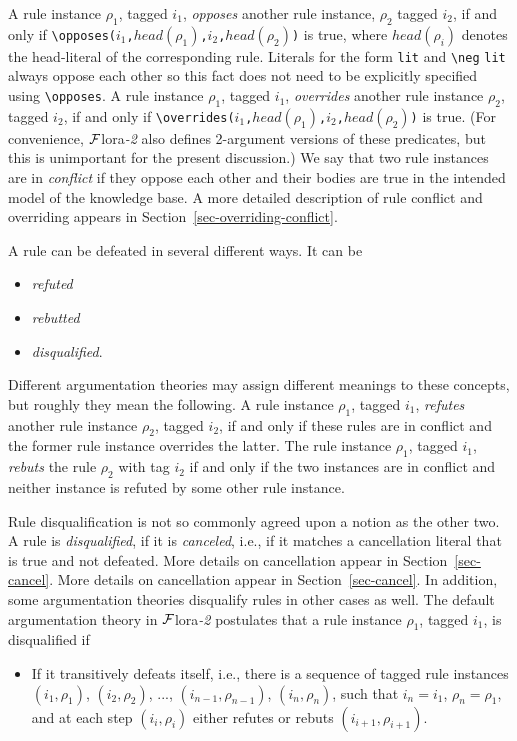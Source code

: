 \documentclass[11pt]{article}
\newcommand{\FLORA}{{\mbox{\sc ${\cal F}${lora}\rm\emph{-2}}}\xspace}
\newcommand{\FLSYSTEM}{\FLORA}
\newcommand{\bs}{\textbackslash}
\newcommand{\RULELOGNEG}{{\texttt{{\bs}neg}}\xspace}
\begin{document}
A rule instance $\rho_1$, tagged $i_1$, \emph{opposes} another rule
instance, $\rho_2$ tagged $i_2$, if and only if
\texttt{\bs{}opposes($i_1$,$head(\rho_1)$,$i_2$,$head(\rho_2)$)} is true,
where $head(\rho_i)$ denotes the head-literal of the corresponding rule.
Literals for the form \texttt{lit} and \texttt{\RULELOGNEG}  \texttt{lit} always oppose 
each other so this fact does not need to be explicitly specified using
\texttt{\bs{}opposes}.   
A rule instance $\rho_1$, tagged
$i_1$, \emph{overrides} another rule instance $\rho_2$, tagged $i_2$, if and
only if \texttt{\bs{}overrides($i_1$,$head(\rho_1)$,$i_2$,$head(\rho_2)$)} is
true. (For convenience, \FLSYSTEM also defines 2-argument versions of these
predicates, but this is unimportant for the present discussion.)
We say that two rule instances are in \emph{conflict} if they oppose each other
and their bodies are true in the intended model of the knowledge base.
A more detailed description of rule conflict and overriding appears in
Section~\ref{sec-overriding-conflict}.

A rule can be defeated in several different ways. It can be
\begin{itemize}
\item  \emph{refuted}
\item  \emph{rebutted} 
\item  \emph{disqualified}. 
\end{itemize}
Different argumentation theories may assign different meanings to these
concepts, but roughly they mean the following. A rule instance $\rho_1$,
tagged $i_1$, \emph{refutes} another rule instance $\rho_2$, tagged $i_2$, 
if and only if these rules are in conflict and the former rule instance
overrides the latter. The rule instance $\rho_1$,
tagged $i_1$, \emph{rebuts} the rule $\rho_2$ with tag $i_2$ if and only if the two
instances are in conflict and neither instance is refuted by some other
rule instance.

Rule disqualification is not so commonly agreed upon a notion as the other
two.  A rule is \emph{disqualified}, if it is \emph{canceled}, i.e., 
if it matches a
cancellation literal that is true and not defeated. More details on
cancellation appear in Section~\ref{sec-cancel}. More details on
cancellation appear in Section~\ref{sec-cancel}. In addition, some
argumentation theories disqualify rules in other cases as well.
The default argumentation theory in \FLSYSTEM postulates that a
rule instance $\rho_1$, tagged $i_1$, is disqualified if
\begin{itemize}
\item If it transitively defeats itself, i.e., there is a sequence of
  tagged rule instances $(i_1,\rho_1)$, $(i_2,\rho_2)$, ...,
  $(i_{n-1},\rho_{n-1})$, $(i_n,\rho_n)$, such that $i_n=i_1$,
  $\rho_n=\rho_1$, and at each step $(i_i,\rho_i)$ either refutes or rebuts
  $(i_{i+1},\rho_{i+1})$.
\end{itemize}
\end{document}
